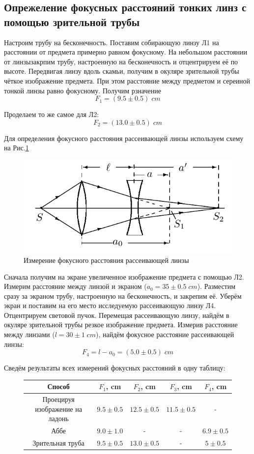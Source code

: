 \documentclass{article}
\begin{document}
\subsection{Опрежеление фокусных расстояний тонких линз с помощью зрительной трубы}
Настроим трубу на бесконечность. Поставим собирающую линзу Л1 на расстоянии от предмета примерно равном
фокусному. На небольшом расстоянии от линзызакрпим трубу, настроенную на бесконечность и
отцентрируем её по высоте. Передвигая линзу вдоль скамьи, получим в окуляре зрительной трубы чёткое
изображение предмета. При этом расстояние между предметом и сереиной тонкой линзы равно фокусному.
Получим рзначение
\[ F_1 = (9.5\pm 0.5)\; cm\]

Проделаем то же самое для Л2:
\[ F_2 = (13.0\pm 0.5)\; cm\]

Для определения фокусного расстояния рассеивающей линзы используем схему на Рис.\ref{fig:dispel}
\begin{figure}[H]
  \centering
  \includegraphics[width = \textwidth]{dispel.png}
  \caption{Измерение фокусного расстояния рассеивающей линзы}\label{fig:dispel}
\end{figure}

Сначала получим на экране увеличенное изображение предмета с помощью Л2. Измерим расстояние
между линзой и экраном (\(a_0 = 35\pm 0.5\; cm\)). Разместим сразу за экраном трубу,
настроенную на бесконечность, и закрепим её. Уберём экран и поставим на его место исследуемую
рассеивающую линзу Л4. Отцентрируем световой пучок. Перемещая рассеивающую линзу, найдём в 
окуляре зрительной трубы резкое изображение предмета. Измерив расстояние между линзами
(\(l = 30 \pm 1\; cm\)), найдём фокусное расстояние рассеивающей линзы:
\[ F_4 = l - a_0 = (5.0 \pm 0.5)\; cm \]

Сведём результаты всех измерений фокусных расстояний в одну таблицу:
\begin{figure}[H]
    \centering
    \begin{tabular}{|c|c|c|c|c|}
      \hline
      Способ & \(F_1\), cm & \(F_2\), cm & \(F_3\), cm & \(F_4\), cm \\\hline
      Проецируя изображение на ладонь   & \(9.5 \pm 0.5\) & \(12.5 \pm 0.5\) & \(11.5\pm 0.5\) & - \\\hline
      Аббе     & \(9.0 \pm 1.0\) & - & - &\(6.9 \pm 0.5\) \\\hline
      Зрительная труба & \(9.5 \pm 0.5\) & \(13.0 \pm 0.5\) & - &\(5 \pm 0.5\) \\\hline
    \end{tabular}
  \end{figure}
\end{document}
